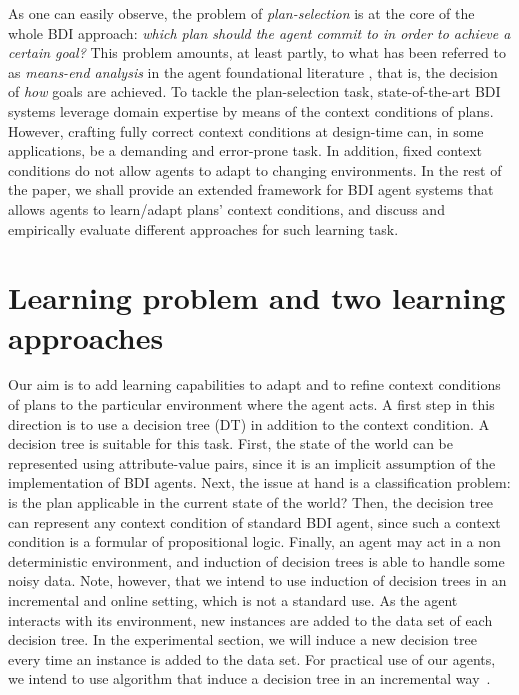 \documentclass{article}
\begin{document}
As one can easily observe, the problem of \textit{plan-selection} is at the core
of the whole BDI approach:
\emph{which plan should the agent commit to in order to achieve a certain goal?}
This problem amounts, at least partly, to what has been referred to as
\emph{means-end analysis} in the agent foundational literature
\cite{Pollack92-IRMA,Bratman88}, that is, the decision of \textit{how} goals are
achieved.
To tackle the plan-selection task, state-of-the-art BDI systems leverage domain
expertise by means of the context conditions of plans. However, crafting fully
correct context conditions at design-time can, in some applications, be a
demanding and error-prone task. In addition, fixed context conditions do not
allow agents to adapt to changing environments.
In the rest of the paper, we shall provide an extended framework for BDI agent
systems that allows agents to learn/adapt plans' context conditions, and discuss
and empirically evaluate different approaches for such learning task.


\section{Learning problem and two learning approaches}

Our aim is to add learning capabilities to adapt and to refine context
conditions of plans to the particular environment where the agent
acts.  A first step in this direction is to use a decision tree (DT)
in addition to the context condition. A decision tree is suitable for
this task.  First, the state of the world can be represented using
attribute-value pairs, since it is an implicit assumption of the
implementation of BDI agents. Next, the issue at hand is a
classification problem: is the plan applicable in the current state of
the world?  Then, the decision tree can represent any context
condition of standard BDI agent, since such a context condition is a
formular of propositional logic. Finally, an agent may act in a non
deterministic environment, and induction of decision trees is able to
handle some noisy data.  Note, however, that we intend to use
induction of decision trees in an incremental and online setting,
which is not a standard use.  As the agent interacts with its
environment, new instances are added to the data set of each decision
tree. In the experimental section, we will induce a new decision tree
every time an instance is added to the data set. For practical use of
our agents, we intend to use algorithm that induce a decision tree in
an incremental way~\cite{Swere06:Fast,Utgoff97Decision}.
\end{document}
